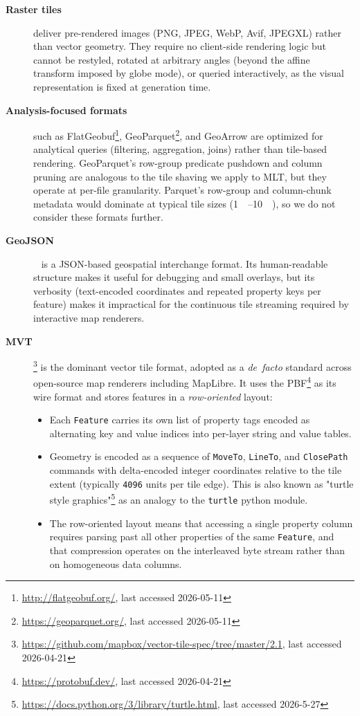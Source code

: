 \begin{description}
    \item[\textbf{Raster tiles}] deliver pre-rendered images (\ac{PNG}, JPEG, WebP, Avif, JPEGXL) rather than vector geometry.
    They require no client-side rendering logic but cannot be restyled, rotated at arbitrary angles (beyond the affine transform imposed by globe mode), or queried interactively, as the visual representation is fixed at generation time.

    \item[\textbf{Analysis-focused formats}] such as FlatGeobuf\footnote{\url{http://flatgeobuf.org/}, last accessed 2026-05-11}, GeoParquet\footnote{\url{https://geoparquet.org/}, last accessed 2026-05-11}, and GeoArrow are optimized for analytical queries (filtering, aggregation, joins) rather than tile-based rendering.
    GeoParquet's row-group predicate pushdown and column pruning are analogous to the tile shaving we apply to \ac{MLT}, but they operate at per-file granularity.
    Parquet's row-group and column-chunk metadata would dominate at typical tile sizes (\qtyrange{1}{10}{\kilo\byte}), so we do not consider these formats further.

    \item[\textbf{\ac{GeoJSON}}]~\cite{butlerGeoJSONFormat2016} is a \ac{JSON}-based geospatial interchange format.
    Its human-readable structure makes it useful for debugging and small overlays, but its verbosity (text-encoded coordinates and repeated property keys per feature) makes it impractical for the continuous tile streaming required by interactive map renderers.

    \item[\textbf{\acf{MVT}}]\footnote{\url{https://github.com/mapbox/vector-tile-spec/tree/master/2.1}, last accessed 2026-04-21} is the dominant vector tile format, adopted as a \emph{de~facto} standard across open-source map renderers including MapLibre.
    It uses the \ac{PBF}\footnote{\url{https://protobuf.dev/}, last accessed 2026-04-21} as its wire format and stores features in a \emph{row-oriented} layout:
\begin{itemize}
    \item Each \texttt{Feature} carries its own list of property tags encoded as alternating key and value indices into per-layer string and value tables.
    \item Geometry is encoded as a sequence of \texttt{MoveTo}, \texttt{LineTo}, and \texttt{ClosePath} commands with delta-encoded integer coordinates relative to the tile extent (typically \texttt{4096} units per tile edge).
    This is also known as "turtle style graphics"\footnote{\url{https://docs.python.org/3/library/turtle.html}, last accessed 2026-5-27} as an analogy to the \texttt{turtle} python module.
    \item The row-oriented layout means that accessing a single property column requires parsing past all other properties of the same \texttt{Feature}, and that compression operates on the interleaved byte stream rather than on homogeneous data columns.
\end{itemize}



\end{description}
